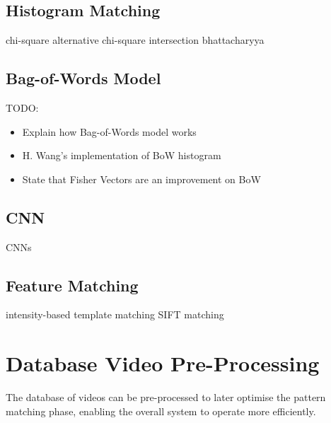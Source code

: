 
\subsection{Histogram Matching}

chi-square
alternative chi-square
intersection
bhattacharyya


\subsection{Bag-of-Words Model}

TODO:
\begin{itemize}
    \item Explain how Bag-of-Words model works
    \item H. Wang's implementation of BoW histogram \cite{wang2016actionregonition}
    \item State that Fisher Vectors are an improvement on BoW
\end{itemize}


\subsection{CNN}

CNNs

\subsection{Feature Matching}

intensity-based template matching
SIFT matching

\section{Database Video Pre-Processing}

The database of videos can be pre-processed to later optimise the pattern matching phase, enabling the overall system to operate more efficiently.


